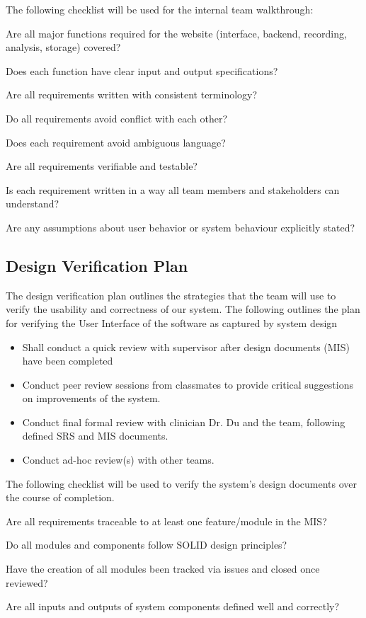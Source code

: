 \documentclass[12pt, titlepage]{article}
\begin{document}
The following checklist will be used for the internal team walkthrough: \\
\begin{todolist}
  \item Are all major functions required for the website (interface, backend, recording, analysis, storage) covered?
  \item Does each function have clear input and output specifications?
  \item Are all requirements written with consistent terminology?
  \item Do all requirements avoid conflict with each other?
  \item Does each requirement avoid ambiguous language?
  \item Are all requirements verifiable and testable?
  \item Is each requirement written in a way all team members and stakeholders can understand?
  \item Are any assumptions about user behavior or system behaviour explicitly stated?
\end{todolist}

\subsection{Design Verification Plan}


The design verification plan outlines the strategies that the team will use to verify the usability and correctness of our
 system. The following outlines the plan for verifying the User Interface of the software as captured by system design
\begin{itemize}
  \item Shall conduct a quick review with supervisor after design documents (MIS) have been completed 
  \item Conduct peer review sessions from classmates to provide critical suggestions on improvements of the system. 
  \item Conduct final formal review with clinician Dr. Du and the team, following defined SRS and MIS documents. 
  \item Conduct ad-hoc review(s) with other teams.
\end{itemize}

The following checklist will be used to verify the system's design documents over the course of completion.
\begin{todolist}
\item Are all requirements traceable to at least one feature/module in the MIS?
\item Do all modules and components follow SOLID design principles?
\item Have the creation of all modules been tracked via issues and closed once reviewed?
\item Are all inputs and outputs of system components defined well and correctly?
\end{todolist}
\end{document}

